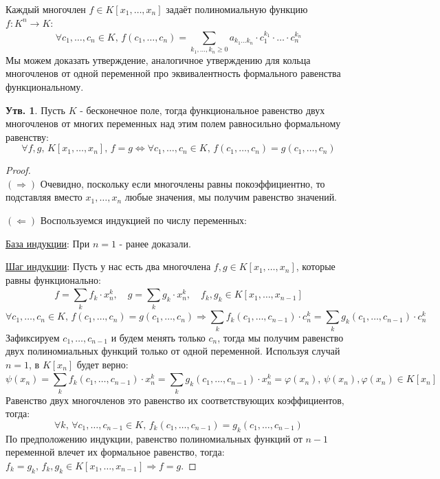 \documentclass[12pt]{article}
\theoremstyle{definition}
\newtheorem{prop}{Утв.}
\newcommand{\ddsum}[2]{\displaystyle\sum\limits_{#1}^{#2}}
\begin{document}
Каждый многочлен $f \in K[x_1,\dotsc,x_n]$ задаёт полиномиальную функцию $f \colon K^n \to K$:
$$
	\forall c_1,\dotsc, c_n \in K, \, f(c_1,\dotsc,c_n) = \ddsum{k_1,\dotsc,k_n \geq 0}{}a_{k_1\dotsc k_n}{\cdot}c_1^{k_1}{\cdot}\dotsc{\cdot}c_n^{k_n}
$$
Мы можем доказать утверждение, аналогичное утверждению для кольца многочленов от одной переменной про эквивалентность формального равенства функциональному.
\begin{prop}
	Пусть $K$ - бесконечное поле, тогда функциональное равенство двух многочленов от многих переменных над этим полем равносильно формальному равенству: 
	$$
		\forall f,g, \, K[x_1,\dotsc,x_n], \, f = g \Leftrightarrow \forall c_1,\dotsc,c_n \in K, \, f(c_1,\dotsc,c_n) = g(c_1,\dotsc, c_n)
	$$
\end{prop}
\begin{proof}\hfill\\
	$(\Rightarrow)$ Очевидно, поскольку если многочлены равны покоэффициентно, то подставляя вместо $x_1,\dotsc,x_n$ любые значения, мы получим равенство значений.
	
	$(\Leftarrow)$ Воспользуемся индукцией по числу переменных:
	
	\uline{База индукции}: При $n = 1$ - ранее доказали.
	
	\uline{Шаг индукции}: Пусть у нас есть два многочлена $f,g \in K[x_1,\dotsc,x_n]$, которые равны функционально:
	$$
		f = \ddsum{k}{}f_k{\cdot}x_n^k, \quad g = \ddsum{k}{}g_k{\cdot}x_n^k, \quad f_k, g_k \in K[x_1,\dotsc, x_{n-1}]
	$$
	$$
		\forall c_1,\dotsc,c_n \in K, \, f(c_1,\dotsc,c_n) = g(c_1,\dotsc,c_n) \Rightarrow \ddsum{k}{}f_k(c_1,\dotsc,c_{n-1}){\cdot}c_n^k = \ddsum{k}{}g_k(c_1,\dotsc,c_{n-1}){\cdot}c_n^k
	$$
	Зафиксируем $c_1,\dotsc,c_{n-1}$ и будем менять только $c_n$, тогда мы получим равенство двух полиномиальных функций только от одной переменной. Используя случай $n=1$, в $K[x_n]$ будет верно:
	$$
		\psi(x_n) = \ddsum{k}{}f_k(c_1,\dotsc,c_{n-1}){\cdot}x_n^k = \ddsum{k}{}g_k(c_1,\dotsc,c_{n-1}){\cdot}x_n^k = \varphi(x_n), \, \psi(x_n), \varphi(x_n) \in K[x_n]
	$$
	Равенство двух многочленов это равенство их соответствующих коэффициентов, тогда: 
	$$
		\forall k, \, \forall c_1,\dotsc,c_{n-1} \in K, \, f_k(c_1,\dotsc,c_{n-1}) = g_k(c_1,\dotsc,c_{n-1})
	$$
	По предположению индукции, равенство полиномиальных функций от $n-1$ переменной влечет их формальное равенство, тогда: $f_k = g_k, \, f_k,g_k \in K[x_1,\dotsc,x_{n-1}] \Rightarrow f = g$.
\end{proof}
\end{document}
